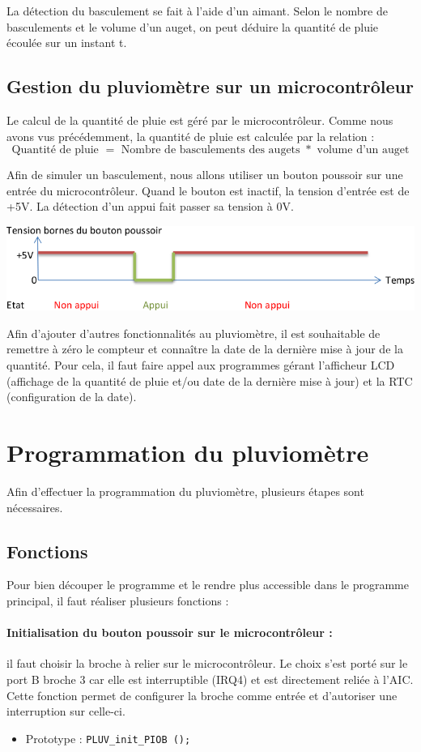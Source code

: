 \documentclass[a4paper]{report}
\begin{document}
La détection du basculement se fait à l’aide d’un aimant. Selon le nombre de basculements et le volume d’un auget, on peut déduire la quantité de pluie écoulée sur un instant t.

\subsection{Gestion du pluviomètre sur un microcontrôleur}
Le calcul de la quantité de pluie est géré par le microcontrôleur.
Comme nous avons vus précédemment, la quantité de pluie est calculée par la relation :
\[
\mbox{Quantité de pluie } = \mbox{ Nombre de basculements des augets } * \mbox{ volume d’un auget}
\]

Afin de simuler un basculement, nous allons utiliser un bouton poussoir sur une entrée du microcontrôleur.
Quand le bouton est inactif, la tension d’entrée est de +5V. La détection d’un appui fait passer sa tension à 0V.

\begin{center}
	\includegraphics[scale=0.4]{images/PLUV_fig3.png}
\end{center}

Afin d’ajouter d’autres fonctionnalités au pluviomètre, il est souhaitable de remettre à zéro le compteur et connaître la date de la dernière mise à jour de la quantité.
Pour cela, il faut faire appel aux programmes gérant l’afficheur LCD (affichage de la quantité de pluie et/ou date de la dernière mise à jour) et la RTC (configuration de la date).

\section{Programmation du pluviomètre}
Afin d’effectuer la programmation du pluviomètre, plusieurs étapes sont nécessaires.
\subsection{Fonctions}
Pour bien découper le programme et le rendre plus accessible dans le programme principal, il faut réaliser plusieurs fonctions :
\paragraph{Initialisation du bouton poussoir sur le microcontrôleur :}
il faut choisir la broche à relier sur le microcontrôleur.
Le choix s'est porté sur le port B broche 3 car elle est interruptible (IRQ4) et est directement reliée à l'AIC.
Cette fonction permet de configurer la broche comme entrée et d’autoriser une interruption sur celle-ci.
\begin{itemize}
\item Prototype : \texttt{PLUV\_init\_PIOB ();}
\end{itemize}
\end{document}
